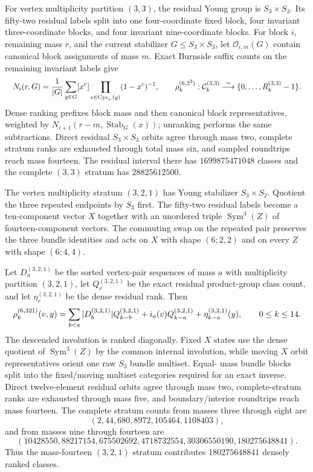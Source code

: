\documentclass{article}
\newcommand{\fitmath}[1]{\resizebox{0.99\linewidth}{!}{$\displaystyle #1$}}
\begin{document}
For vertex multiplicity partition $(3,3)$, the residual Young group is
$S_3\times S_3$. Its fifty-two residual labels split into one four-coordinate
fixed block, four invariant three-coordinate blocks, and four invariant
nine-coordinate blocks. For block $i$, remaining mass $r$, and the current
stabilizer $G\leq S_3\times S_3$, let $\mathcal O_{i,m}(G)$ contain canonical
block assignments of mass $m$. Exact Burnside suffix counts on the remaining
invariant labels give
\begin{equation}
  \fitmath{%
    N_i(r,G)=\frac{1}{|G|}\sum_{g\in G}
      [x^r]\prod_{c\in\operatorname{Cyc}_{i:}(g)}(1-x^c)^{-1},
    \qquad
    \rho_k^{(6,3^2)}:\mathcal C_k^{(3,3)}
      \overset{\sim}{\longrightarrow}\{0,\ldots,R_k^{(3,3)}-1\}.
  }
  \label{eq:optimization-crazy-sextuple-s6-s3s3-vertex-ranking}
\end{equation}
Dense ranking prefixes block mass and then canonical block representatives,
weighted by $N_{i+1}(r-m,\operatorname{Stab}_G(x))$; unranking performs the same
subtractions. Direct residual $S_3\times S_3$ orbits agree through mass two,
complete stratum ranks are exhausted through total mass six, and sampled
roundtrips reach mass fourteen. The residual interval there has
$1699875471048$ classes and the complete $(3,3)$ stratum has $28825612500$.

The vertex multiplicity stratum $(3,2,1)$ has Young stabilizer
$S_3\times S_2$. Quotient the three repeated endpoints by $S_3$ first. The
fifty-two residual labels become a ten-component vector $X$ together with an
unordered triple $\operatorname{Sym}^3(Z)$ of fourteen-component vectors. The
commuting swap on the repeated pair preserves the three bundle identities and
acts on $X$ with shape $(6;2,2)$ and on every $Z$ with shape $(6;4,4)$.

Let $D_a^{(3,2,1)}$ be the sorted vertex-pair sequences of mass $a$ with
multiplicity partition $(3,2,1)$, let $Q_r^{(3,2,1)}$ be the exact residual
product-group class count, and let $\eta_r^{(3,2,1)}$ be the dense residual
rank. Then
\begin{equation}
  \fitmath{%
    \rho^{(6,321)}_k(v,y)
      =\sum_{b<a}|D_b^{(3,2,1)}|Q_{k-b}^{(3,2,1)}
       +i_a(v)Q_{k-a}^{(3,2,1)}+\eta_{k-a}^{(3,2,1)}(y),
    \qquad 0\leq k\leq14.
  }
  \label{eq:optimization-crazy-sextuple-s6-s3s2-vertex-ranking}
\end{equation}
The descended involution is ranked diagonally. Fixed $X$ states use the dense
quotient of $\operatorname{Sym}^3(Z)$ by the common internal involution, while
moving $X$ orbit representatives orient one raw $S_3$ bundle multiset. Equal-
mass bundle blocks split into the fixed/moving multiset categories required for
an exact inverse. Direct twelve-element residual orbits agree through mass two,
complete-stratum ranks are exhausted through mass five, and boundary/interior
roundtrips reach mass fourteen. The complete stratum counts from masses three
through eight are
\[
  (2,44,680,8972,105464,1108403),
\]
and from masses nine through fourteen are
\[
  (10428550,88217154,675502692,4718732554,30306550190,180275648841).
\]
Thus the mass-fourteen $(3,2,1)$ stratum contributes $180275648841$ densely
ranked classes.
\end{document}
